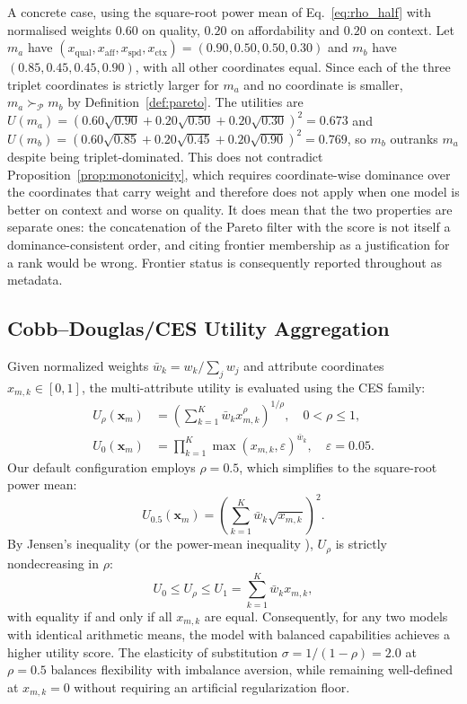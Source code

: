 \documentclass[pdflatex,sn-mathphys-num]{sn-jnl}
\theoremstyle{thmstyleone}
\theoremstyle{thmstylethree}
\begin{document}
A concrete case, using the square-root power mean of Eq.~\ref{eq:rho_half} with normalised weights $0.60$ on quality, $0.20$ on affordability and $0.20$ on context. Let $m_a$ have $(x_{\text{qual}}, x_{\text{aff}}, x_{\text{spd}}, x_{\text{ctx}}) = (0.90, 0.50, 0.50, 0.30)$ and $m_b$ have $(0.85, 0.45, 0.45, 0.90)$, with all other coordinates equal. Since each of the three triplet coordinates is strictly larger for $m_a$ and no coordinate is smaller, $m_a \succ_{\mathcal{P}} m_b$ by Definition~\ref{def:pareto}. The utilities are $U(m_a) = (0.60\sqrt{0.90} + 0.20\sqrt{0.50} + 0.20\sqrt{0.30})^2 = 0.673$ and $U(m_b) = (0.60\sqrt{0.85} + 0.20\sqrt{0.45} + 0.20\sqrt{0.90})^2 = 0.769$, so $m_b$ outranks $m_a$ despite being triplet-dominated. This does not contradict Proposition~\ref{prop:monotonicity}, which requires coordinate-wise dominance over the coordinates that carry weight and therefore does not apply when one model is better on context and worse on quality. It does mean that the two properties are separate ones: the concatenation of the Pareto filter with the score is not itself a dominance-consistent order, and citing frontier membership as a justification for a rank would be wrong. Frontier status is consequently reported throughout as metadata.

\subsection{Cobb--Douglas/CES Utility Aggregation}\label{subsec:ces}

Given normalized weights $\bar{w}_k = w_k / \sum_j w_j$ and attribute coordinates $x_{m, k} \in [0, 1]$, the multi-attribute utility is evaluated using the CES family:
\begin{align}
U_\rho(\mathbf{x}_m) &= \left( \sum_{k=1}^K \bar{w}_k x_{m, k}^\rho \right)^{1/\rho}, \quad 0 < \rho \le 1, \label{eq:ces_formula} \\
U_0(\mathbf{x}_m) &= \prod_{k=1}^K \max(x_{m, k}, \varepsilon)^{\bar{w}_k}, \quad \varepsilon = 0.05. \label{eq:cd_formula}
\end{align}
Our default configuration employs $\rho = 0.5$, which simplifies to the square-root power mean:
\begin{equation}\label{eq:rho_half}
U_{0.5}(\mathbf{x}_m) = \left( \sum_{k=1}^K \bar{w}_k \sqrt{x_{m, k}} \right)^2.
\end{equation}
By Jensen's inequality (or the power-mean inequality \cite{hardy1934inequalities}), $U_\rho$ is strictly nondecreasing in $\rho$:
\begin{equation}\label{eq:jensen}
U_0 \le U_\rho \le U_1 = \sum_{k=1}^K \bar{w}_k x_{m, k},
\end{equation}
with equality if and only if all $x_{m, k}$ are equal. Consequently, for any two models with identical arithmetic means, the model with balanced capabilities achieves a higher utility score. The elasticity of substitution $\sigma = 1 / (1 - \rho) = 2.0$ at $\rho = 0.5$ balances flexibility with imbalance aversion, while remaining well-defined at $x_{m, k} = 0$ without requiring an artificial regularization floor.
\end{document}
